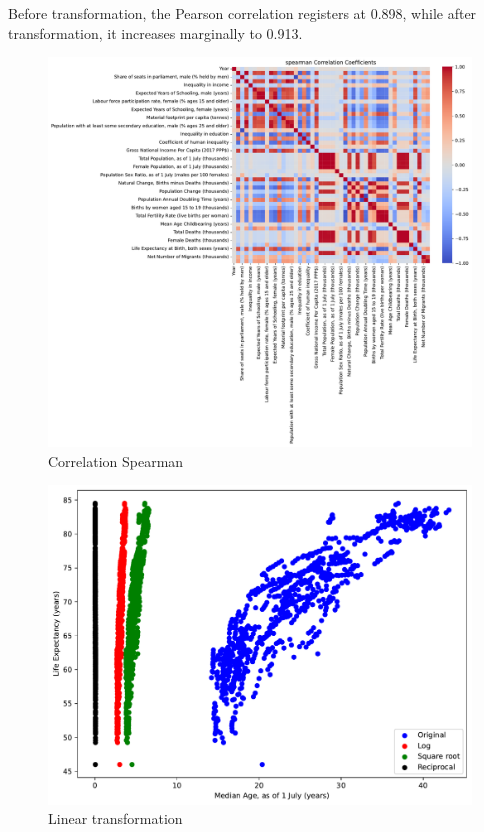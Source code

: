 \documentclass[a4paper]{article}
\begin{document}
Before transformation, the Pearson correlation registers at 0.898, while after transformation, it increases marginally to 0.913.


\begin{figure}[h]
  \begin{center}
    \includegraphics[width=\textwidth]{ola/spearman_correlation.pdf}
    \caption{Correlation Spearman}
    \label{fig:spearman_correlation}
  \end{center}
\end{figure}


\begin{figure}[h]
  \begin{center}
    \includegraphics[width=\textwidth]{ola/linear_transformation.pdf}
    \caption{Linear transformation}
    \label{fig:linear_transformation}
  \end{center}
\end{figure}
\end{document}
